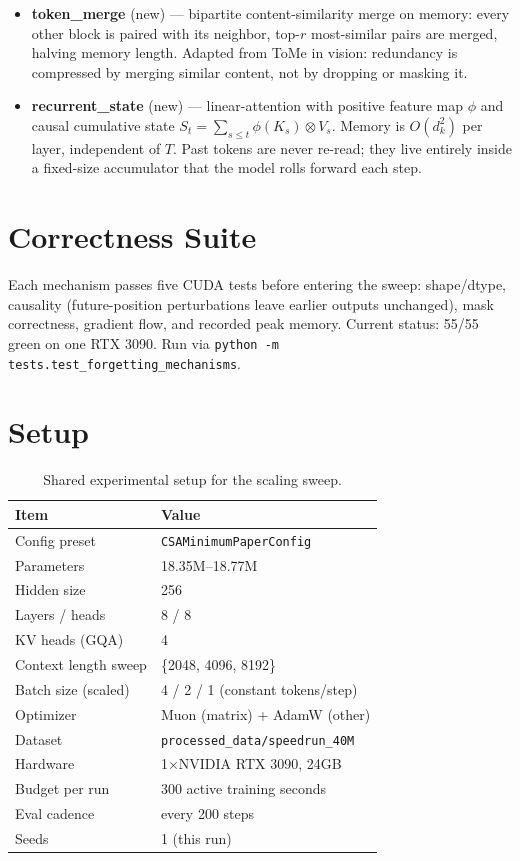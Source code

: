 \documentclass[10pt]{article}
\begin{document}
\begin{itemize}
training determines what stays in memory.
\item \textbf{token\_merge} (new) --- bipartite content-similarity merge
on memory: every other block is paired with its neighbor, top-$r$
most-similar pairs are merged, halving memory length. Adapted from ToMe
in vision: redundancy is compressed by merging similar content, not by
dropping or masking it.
\item \textbf{recurrent\_state} (new) --- linear-attention with positive
feature map $\phi$ and causal cumulative state
$S_t = \sum_{s\leq t} \phi(K_s)\otimes V_s$.
Memory is $O(d_k^2)$ per layer, independent of $T$. Past tokens are
never re-read; they live entirely inside a fixed-size accumulator that
the model rolls forward each step.
\end{itemize}

\section{Correctness Suite}

Each mechanism passes five CUDA tests before entering the sweep:
shape/dtype, causality (future-position perturbations leave earlier
outputs unchanged), mask correctness, gradient flow, and recorded peak
memory. Current status: 55/55 green on one RTX 3090. Run via
\verb|python -m tests.test_forgetting_mechanisms|.

\section{Setup}

\begin{table}[H]
\centering
\small
\caption{Shared experimental setup for the scaling sweep.}
\label{tab:setup}
\begin{tabular}{@{}ll@{}}
\toprule
Item & Value \\
\midrule
Config preset & \texttt{CSAMinimumPaperConfig} \\
Parameters & 18.35M--18.77M \\
Hidden size & 256 \\
Layers / heads & 8 / 8 \\
KV heads (GQA) & 4 \\
Context length sweep & \{2048, 4096, 8192\} \\
Batch size (scaled) & 4 / 2 / 1 (constant tokens/step) \\
Optimizer & Muon (matrix) + AdamW (other) \\
Dataset & \texttt{processed\_data/speedrun\_40M} \\
Hardware & 1$\times$NVIDIA RTX 3090, 24GB \\
Budget per run & 300 active training seconds \\
Eval cadence & every 200 steps \\
Seeds & 1 (this run) \\
\bottomrule
\end{tabular}
\end{table}
\end{document}
